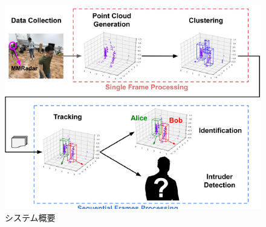 \documentclass[dvipdfmx]{jsarticle}
\begin{document}
\begin{figure}[H]
    \begin{center}
    \includegraphics[width=0.7\linewidth]{./img/tuiseki_system.png}
    \end{center}
    \caption{システム概要}
    \end{figure}
\end{document}
